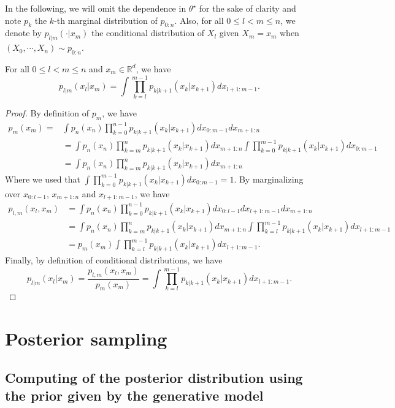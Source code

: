 \documentclass[12pt]{article}
\begin{document}
In the following, we will omit the dependence in $\theta^{\star}$ for the sake of clarity and note $p_k$ 
the $k$-th marginal distribution of $p_{0:n}$. Also, for all $0 \leq l<m \leq n $, we denote by $p_{l|m}(\cdot | x_m)$ the
conditional distribution of $X_l$ given $X_m = x_m$ when $(X_0, \cdots, X_n) \sim p_{0:n}$.

\begin{assumption}
    For all $0 \leq l < m \leq n$ and $x_m \in \mathbb{R}^d$, we have
    $$p_{l|m}(x_l | x_m) = \int \prod_{k=l}^{m-1} p_{k|k+1}(x_k | x_{k+1}) dx_{l+1:m-1}.$$
\end{assumption}

\begin{proof}
    By definition of $p_m$, we have
    \begin{align*}
        p_m(x_m) = & \int p_n(x_n) \prod_{k=0}^{n-1} p_{k|k+1}(x_k | x_{k+1}) dx_{0:m-1} dx_{m+1:n} \\
        & = \int p_n(x_n) \prod_{k=m}^{n} p_{k|k+1}(x_k | x_{k+1}) dx_{m+1:n} 
        \int \prod_{k=0}^{m-1} p_{k|k+1}(x_k | x_{k+1}) dx_{0:m-1} \\
        & = \int p_n(x_n) \prod_{k=m}^{n} p_{k|k+1}(x_k | x_{k+1}) dx_{m+1:n}
    \end{align*}
    Where we used that $\int \prod_{k=0}^{m-1} p_{k|k+1}(x_k | x_{k+1}) dx_{0:m-1} = 1$.
    By marginalizing over $x_{0:l-1}$, $x_{m+1:n}$ and $x_{l+1:m-1}$, we have
    \begin{align*}
        p_{l,m}(x_l, x_m) 
        & = \int p_n(x_n) \prod_{k=0}^{n-1} p_{k|k+1}(x_k | x_{k+1}) dx_{0:l-1} dx_{l+1:m-1} dx_{m+1:n} \\
        & = \int p_n(x_n) \prod_{k=m}^{n} p_{k|k+1}(x_k | x_{k+1}) dx_{m+1:n} 
        \int \prod_{k=l}^{m-1} p_{k|k+1}(x_k | x_{k+1}) dx_{l+1:m-1}  \\
        & = p_m(x_m) \int \prod_{k=l}^{m-1} p_{k|k+1}(x_k | x_{k+1}) dx_{l+1:m-1}.
    \end{align*}
    Finally, by definition of conditional distributions, we have
    $$p_{l|m}(x_l | x_m) = \frac{p_{l,m}(x_l, x_m)}{p_m(x_m)} 
    = \int \prod_{k=l}^{m-1} p_{k|k+1}(x_k | x_{k+1}) dx_{l+1:m-1}.$$
\end{proof}

\section{Posterior sampling}

\subsection{Computing of the posterior distribution using the prior given by the generative model}
\end{document}
